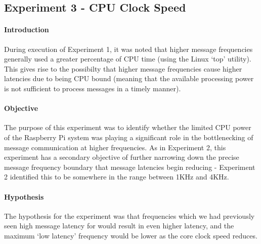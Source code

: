 \documentclass[../dissertation.tex]{subfiles}
\begin{document}
\subsection{Experiment 3 - CPU Clock Speed}
\label{experiment3-cpu-speed}

\paragraph{Introduction} During execution of Experiment 1, it was noted that higher message frequencies generally used a greater percentage of CPU time (using the Linux `top' utility). This gives rise to the possibilty that higher message frequencies cause higher latencies due to being CPU bound (meaning that the available processing power is not sufficient to process messages in a timely manner).

\paragraph{Objective} The purpose of this experiment was to identify whether the limited CPU power of the Raspberry Pi system was playing a significant role in the bottlenecking of message communication at higher frequencies. As in Experiment 2, this experiment has a secondary objective of further narrowing down the precise message frequency boundary that message latencies begin reducing - Experiment 2 identified this to be somewhere in the range between 1KHz and 4KHz.

\paragraph{Hypothesis} The hypothesis for the experiment was that frequencies which we had previously seen high message latency for would result in even higher latency, and the maximum `low latency' frequency would be lower as the core clock speed reduces.
\end{document}
